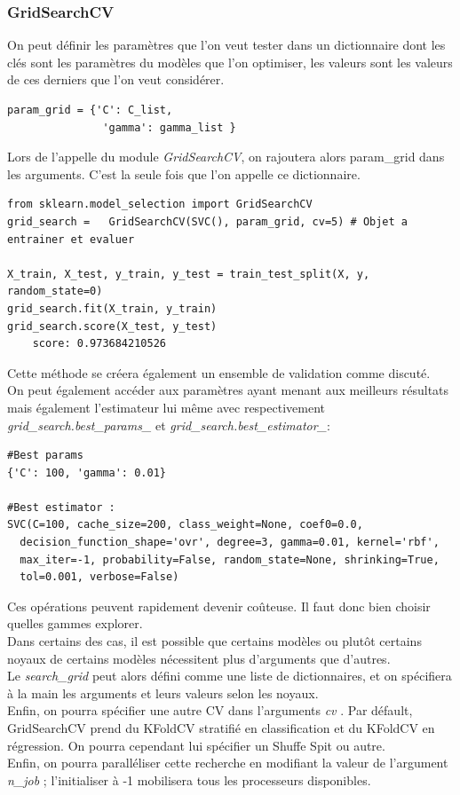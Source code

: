 \documentclass[a4paper,12pt]{report}
\newcommand{\rbk}[1]{\color{red}\textit{#1} \color{black}  
}
\newcommand\bk{\color{black}}
\newcommand\red{\color{red}}
\numberwithin{equation}{section} %
\begin{document}
\subsubsection{GridSearchCV}
On peut définir les paramètres que l'on veut tester dans un dictionnaire dont les clés sont les paramètres du modèles que l'on optimiser, les valeurs sont les valeurs de ces derniers que l'on veut considérer.
\begin{lstlisting}
param_grid = {'C': C_list,
               'gamma': gamma_list }
\end{lstlisting}
Lors de l'appelle du module \textit{GridSearchCV}, on rajoutera alors  param\_grid dans les arguments. C'est la seule fois que l'on appelle ce dictionnaire.
\begin{lstlisting}
from sklearn.model_selection import GridSearchCV
grid_search =   GridSearchCV(SVC(), param_grid, cv=5) # Objet a entrainer et evaluer

X_train, X_test, y_train, y_test = train_test_split(X, y, random_state=0)
grid_search.fit(X_train, y_train)
grid_search.score(X_test, y_test)
	score: 0.973684210526 
\end{lstlisting}
Cette méthode se créera également un ensemble de validation comme discuté.\\
On peut également accéder aux paramètres ayant menant aux meilleurs résultats mais également l'estimateur lui même avec respectivement \red \textit{grid\_search.best\_params\_}  \bk et \red \textit{grid\_search.best\_estimator\_}\bk: 
\begin{lstlisting}
#Best params
{'C': 100, 'gamma': 0.01}

#Best estimator :
SVC(C=100, cache_size=200, class_weight=None, coef0=0.0,
  decision_function_shape='ovr', degree=3, gamma=0.01, kernel='rbf',
  max_iter=-1, probability=False, random_state=None, shrinking=True,
  tol=0.001, verbose=False)

\end{lstlisting}

\noindent Ces opérations peuvent rapidement devenir coûteuse. Il faut donc bien choisir quelles gammes explorer.\\
Dans certains des cas, il est possible que certains modèles ou plutôt certains noyaux de certains modèles nécessitent plus d'arguments que d'autres.\\
Le \textit{search\_grid} peut alors défini comme une liste de dictionnaires, et on spécifiera à la main les arguments et leurs valeurs selon les noyaux.\\
Enfin, on pourra spécifier une autre CV dans l'arguments \rbk{cv}. Par défault, GridSearchCV prend du KFoldCV stratifié en classification et du KFoldCV en régression. On pourra cependant lui spécifier un Shuffe Spit ou autre.\\
Enfin, on pourra paralléliser cette recherche en modifiant la valeur de l'argument \rbk{n\_job}; l'initialiser à -1 mobilisera tous les processeurs disponibles.
\end{document}
